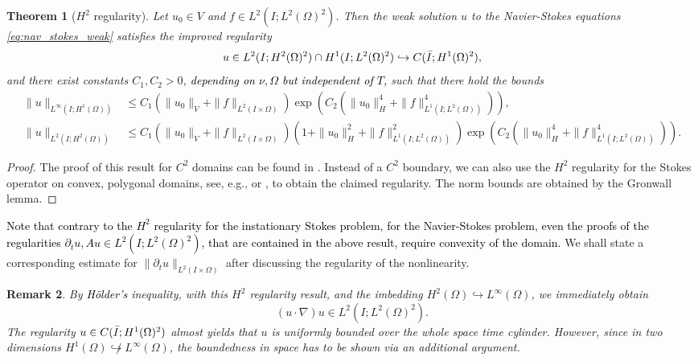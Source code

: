 \documentclass{m2an}
\newcommand\blue[1]{\textcolor{black}{#1}}
\newtheorem{theorem}{Theorem}[section]
\newtheorem{remark}[theorem]{Remark}
\newcommand{\LinfHone}{L^\infty(I;H^1(\Omega))}
\newcommand{\LtwoHtwo}{L^2(I;H^2(\Omega))}
\newcommand{\LtwoLtwo}{L^2(I \times \Omega)}
\newcommand{\LoneLtwo}{L^1(I ;L^2(\Omega))}
\begin{document}
\begin{theorem}[$H^2$ regularity]\label{thm:h2_regularity}
  Let $u_0 \in V$ and $f \in L^2(I;L^2(\Omega)^2)$.
  Then the weak solution $u$ to the Navier-Stokes equations \eqref{eq:nav_stokes_weak}
  satisfies the improved regularity
  \begin{equation*}
    u \in L^2(I;H^2(\Omega)^2) \cap H^1(I;L^2(\Omega)^2) \hookrightarrow C(\blue{\bar I};H^1(\Omega)^2),
  \end{equation*}
  and there exist constants $C_1, C_2 > 0$, \blue{depending on $\nu,\Omega$ but independent of $T$,}
  such that there hold the bounds
  \begin{align*}
    \|u\|_{\LinfHone} & \le C_1 \left(\|u_0\|_{V} + \|f\|_{\LtwoLtwo}\right) 
      \exp\left(C_2\left(\|u_0\|_H^4 + \|f\|_{\LoneLtwo}^4\right)\right),\\
    \|u\|_{\LtwoHtwo} & \le C_1 \left(\|u_0\|_{V} + \|f\|_{\LtwoLtwo}\right)
    \left(1 + \|u_0\|_{H}^2 + \|f\|_{\LoneLtwo}^2\right)
                      \exp\left(C_2\left(\|u_0\|_H^4 + \|f\|_{\LoneLtwo}^4\right)\right).
  \end{align*}
\end{theorem}
\begin{proof}
  The proof of this result for $C^2$ domains can be found in \cite[Chapter 3, Theorem 3.10]{Temam1977}.
  Instead of a $C^2$ boundary, we can also use the $H^2$ regularity for the Stokes operator on 
  convex, polygonal domains, see, e.g., \cite[Theorem 5.5]{Dauge1989} or \cite[Theorem 2]{Kellogg1976},
  to obtain the claimed regularity. The norm bounds are obtained by the Gronwall lemma.
\end{proof}
\blue{Note that contrary to the $H^2$ regularity for the instationary Stokes problem, 
for the Navier-Stokes problem, even the proofs of the regularities $\partial_t u, Au \in L^2(I;L^2(\Omega)^2)$,
that are contained in the above result, require convexity of the domain.}
We shall state a corresponding estimate for $\|\partial_t u\|_{\LtwoLtwo}$ after discussing 
the regularity of the nonlinearity.
\begin{remark}\label{rem:LtwoLtwo_nonlinearity}
  By \blue{Hölder's} inequality, with this $H^2$ regularity result, and the imbedding
  $H^2(\Omega) \hookrightarrow L^\infty(\Omega)$, we immediately obtain
  \begin{equation*}
    (u \cdot \nabla) u \in L^2(I;L^2(\Omega)^2).
  \end{equation*}
  The regularity $u \in C(\blue{\bar I};H^1(\Omega)^2)$  almost yields that $u$ is uniformly
  bounded over the whole space time cylinder. However, since in two dimensions
  $H^1(\Omega) \not\hookrightarrow L^\infty(\Omega)$, the boundedness in space
  has to be shown via an additional argument.
\end{remark}
\end{document}
